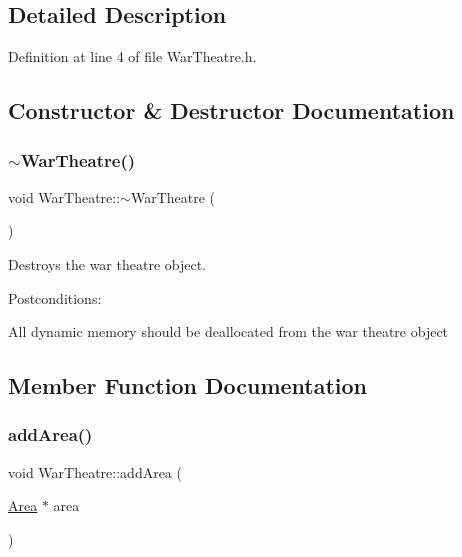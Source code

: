 \subsection{Detailed Description}


Definition at line 4 of file War\+Theatre.\+h.



\subsection{Constructor \& Destructor Documentation}
\mbox{\label{classWarTheatre_a4be07a7321747894bd035ec130a06c56}} 
\subsubsection{\texorpdfstring{$\sim$\+War\+Theatre()}{~WarTheatre()}}
{\footnotesize\ttfamily void War\+Theatre\+::$\sim$\+War\+Theatre (\begin{DoxyParamCaption}{ }\end{DoxyParamCaption})}



Destroys the war theatre object. 

Postconditions\+:
\begin{DoxyItemize}
\item All dynamic memory should be deallocated from the war theatre object 
\end{DoxyItemize}

\subsection{Member Function Documentation}
\mbox{\label{classWarTheatre_adc871336a6bf1263216b0f87da04cc57}} 
\subsubsection{\texorpdfstring{add\+Area()}{addArea()}}
{\footnotesize\ttfamily void War\+Theatre\+::add\+Area (\begin{DoxyParamCaption}\item[{\hyperlink{classArea}{Area} $\ast$}]{area }\end{DoxyParamCaption})}



